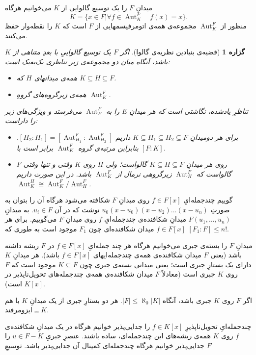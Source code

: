 \documentclass[12pt,a4paper]{article}
\theoremstyle{colorhead}
\newtheorem{prop}[thm]{گزاره}
\DeclareMathOperator{\Aut}{Aut}
\begin{document}
میدانِ
$F$
را یک توسیع گالوایی از
$K$
می‌خوانیم هرگاه
\[
K=\{x\in F|\forall f\in \Aut_K^F \quad f(x)=x\}.
\]
منظور از
$\Aut^F_K$
مجموعه‌ی همه‌ی اتومرفیسمهایی از
$F$
است که
$K$
را نقطه‌وار حفظ می‌کنند.
\begin{prop}[قضیه‌ی بنیادین نظریه‌ی گالوا]
اگر
$F$
یک توسیع گالواییِ با بعدِ متناهی از
$K$
باشد، آنگاه میان دو مجموعه‌ی زیر تناظری یک‌به‌یک است:
\begin{itemize}
\item 
همه‌ی میدانهای $H$ که
$K\subseteq H\subseteq F$.
\item 
همه‌ی زیرگروه‌های گروهِ
$\Aut^F_K$.
\end{itemize}
تناظرِ یادشده، نگاشتی است که هر
میدانِ
$E$
را به
$\Aut^F_E$
می‌فرستد و ویژگی‌های زیر را داراست:
\begin{itemize}
\item 
برای هر دومیدانِ
$K\subseteq H_1\subseteq H_2\subseteq F$
داریم
$[H_2:H_1]=[\Aut^F_{H_1}:\Aut^F_{H_2}]$.
بنابراین مرتبه‌ی
گروه
$\Aut^F_K$
برابر است با
$[F:K]$.
\item 
$F$
روی هر میدانِ
$K\subseteq H\subseteq F$
گالواست؛ ولی
$H$
روی
$K$
وقتی و تنها وقتی گالواست که 
$\Aut^F_H$
زیرگروهی نرمال از
$\Aut^F_K$
باشد. در این صورت داریم
$\Aut^H_K\cong \Aut^F_K/\Aut^F_H$.
\end{itemize}
\end{prop}
گوییم چندجمله‌ایِ
$f\in F[x]$
روی میدانِ
$F$
شکافته می‌شود
هرگاه آن را بتوان به صورتِ
$u_0(x-u_0)(x-u_2)\ldots (x-u_n)$
نوشت که در آن
$u_i\in F$.
به میدانِ
$F(u_1,\ldots, u_n)$
میدانِ شکافنده‌ی 
چندجمله‌ایِ
$f$
روی میدانِ
$F$
می‌گوییم. برای هر
$f\in F[x]$
میدان شکافنده‌ای چون
$F_1$
موجود است به طوری که
$[F_1:F]\leq n!$.
\par 
میدانِ
$F$
را بسته‌ی جبری می‌خوانیم هرگاه هر چند جمله‌ایِ
$f\in F[x]$
در
$F$
ریشه داشته باشد (یعنی
$F$
میدان شکافنده‌ی همه‌ی چندجمله‌ایهای
$f\in F[x]$
باشد).  هر میدانِ
$K$
دارای یک بستارِ جبری است؛ یعنی میدانی بسته‌ی جبری
چون
$K\subseteq F$
موجود است که $F$
روی
$K$
جبری است  (معادلاً
$F$
میدان شکافنده‌ی همه‌ی چندجمله‌های تحویل‌ناپذیر در
$K[x]$
است).
\par 
اگر
$F$
روی
$K$
جبری باشد، آنگاه
$|F|\leq \aleph_0|K|$.
هر دو بستارِ جبری از یک میدانِ 
$K$
با هم
 $K$
 ــ
ایزومرفند. 
\par 
چندجمله‌ایِ تحویل‌ناپذیرِ
$f\in K[x]$
را جدایی‌پذیر
خوانیم هرگاه در یک میدانِ شکافنده‌ی
$f$
روی
$K$
همه‌ی ریشه‌های 
این چندجمله‌ای، ساده باشند. عنصرِ جبریِ
$u\in F-K$
را جدایی‌پذیر خوانیم هرگاه چندجمله‌ای کمینال آن جدایی‌پذیر باشد. توسیعِ
$F$
\end{document}
